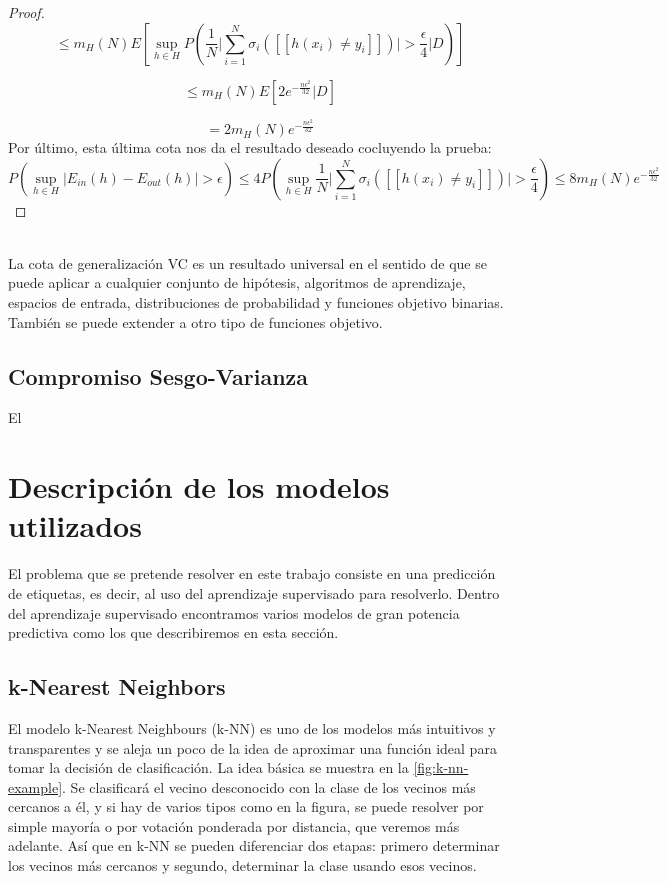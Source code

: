 \begin{proof}
\[ \leq m_{H}(N) E \left[ \sup_{h \in H} P \left( \frac{1}{N} \bigg\vert \sum_{i=1}^{N} \sigma_{i} ( [[ h(x_{i}) \neq y_{i} ]])\bigg\vert > \frac{\epsilon}{4} \bigg\vert D \right) \right] \]

\[\leq m_{H}(N) E \left[ 2 e^{ -\frac{ n\epsilon^{2} }{ 32 } } \vert D \right] \]

\[ = 2 m_{H}(N)e^{ -\frac{ n\epsilon^{2} }{ 32 } } \]
Por último, esta última cota nos da el resultado deseado cocluyendo la prueba:
\[ P \left( \sup_{h \in H} \vert E_{in}(h)-E_{out}(h) \vert >\epsilon \right) \leq 4P \left( \sup_{h \in H} \frac{1}{N} \bigg\vert \sum_{i=1}^{N} \sigma_{i} ( [[ h(x_{i}) \neq y_{i} ]])\bigg\vert > \frac{\epsilon}{4} \right) \leq 8 m_{H}(N)e^{ -\frac{ n\epsilon^{2} }{ 32 } } \]
\end{proof} \cite{VCboundRNowak}\\
La cota de generalización VC es un resultado universal en el sentido de que se puede aplicar a cualquier conjunto de hipótesis, algoritmos de aprendizaje, espacios de entrada, distribuciones de probabilidad y funciones objetivo binarias. También se puede extender a otro tipo de funciones objetivo. \cite{abu2012learning}
\subsection{Compromiso Sesgo-Varianza}
El
\section{Descripción de los modelos utilizados}\label{st:modelos-utilizados}
El problema que se pretende resolver en este trabajo consiste en una predicción de etiquetas, es decir, al uso del aprendizaje supervisado para resolverlo. Dentro del aprendizaje supervisado encontramos varios modelos de gran potencia predictiva como los que describiremos en esta sección.
\subsection{k-Nearest Neighbors}\label{sst:k-nn}
El modelo k-Nearest Neighbours (k-NN) es uno de los modelos más intuitivos y transparentes y se aleja un poco de la idea de aproximar una función ideal para tomar la decisión de clasificación. La idea básica se muestra en la \autoref{fig:k-nn-example}. Se clasificará el vecino desconocido con la clase de los vecinos más cercanos a él, y si hay de varios tipos como en la figura, se puede resolver por simple mayoría o por votación ponderada por distancia, que veremos más adelante. Así que en k-NN se pueden diferenciar dos etapas: primero determinar los vecinos más cercanos y segundo, determinar la clase usando esos vecinos. \cite{padraiddelany2007k}

